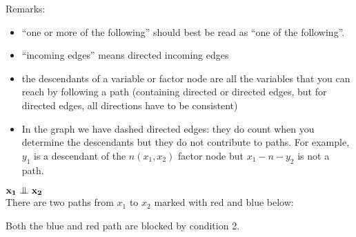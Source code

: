 \begin{exenumerate}
Remarks:
\begin{itemize}
  \item ``one or more of the following'' should best be read as ``one of the following''. 
  \item ``incoming edges'' means directed incoming edges
  \item the descendants of a variable or factor node are all the variables that you can reach by following a path (containing directed or directed edges, but for directed edges, all directions have to be consistent)
  \item In the graph we have dashed directed edges: they do count when you determine the descendants but they do not contribute to paths. For example, $y_1$ is a descendant of the $n(x_1,x_2)$ factor node but $x_1 - n - y_2$ is not a path.
\end{itemize}

\begin{solution}
  $\mathbf{x_1 \mathrel{\perp\mspace{-10mu}\perp} x_2}$\\
  There are two paths from $x_1$ to $x_2$ marked with red and blue below:
\begin{center}
    \end{center}
  Both the blue and red path are blocked by condition 2. 


\end{solution}
\end{exenumerate}
